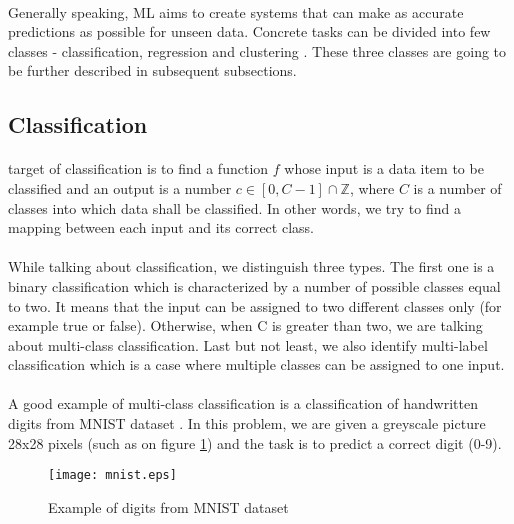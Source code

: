 \paragraph{}
Generally speaking, ML aims to create systems that can make as accurate predictions as possible for unseen data. Concrete tasks can be divided into few classes - classification, regression and clustering \cite{ml_foundations}. These three classes are going to be further described in subsequent subsections.

\subsection{Classification}
\paragraph{}
 target of classification is to find a function $f$ whose input is a data item to be classified and an output is a number $c \in [0,C-1] \cap \mathbb{Z}$, where $C$ is a number of classes into which data shall be classified. In other words, we try to find a mapping between each input and its correct class. \cite{ml_probabilistic}

\paragraph{}
While talking about classification, we distinguish three types. The first one is a binary classification which is characterized by a number of possible classes equal to two. It means that the input can be assigned to two different classes only (for example true or false). Otherwise, when C is greater than two, we are talking about multi-class classification. Last but not least, we also identify multi-label classification which is a case where multiple classes can be assigned to one input. \cite{ml_probabilistic}

\paragraph{}
A good example of multi-class classification is a classification of handwritten digits from MNIST dataset \cite{mnist_page}. In this problem, we are given a greyscale picture 28x28 pixels (such as on figure \ref{mnist_example}) and the task is to predict a correct digit (0-9). 

\begin{figure}[!h]
	\texttt{[image: mnist.eps]}
	\centering
	\caption{Example of digits from MNIST dataset}
	\label{mnist_example}
\end{figure}

